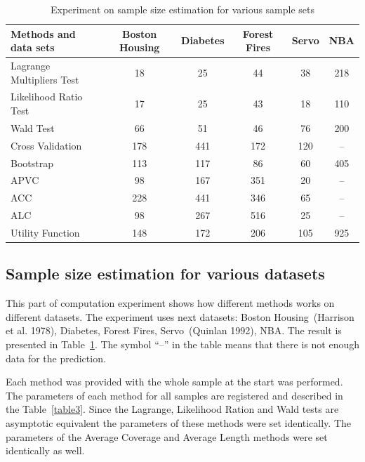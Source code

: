 \documentclass[
11pt,%
tightenlines,%
twoside,%
onecolumn,%
nofloats,%
nobibnotes,%
nofootinbib,%
superscriptaddress,%
noshowpacs,%
centertags]%
{revtex4}
\begin{document}
\begin{table}[!hbp]
\centering
\caption{Experiment on sample size estimation for various sample sets}
\label{table2}
\begin{tabular}{|l|c|c|c|c|c|}
\hline
 Methods and data sets                         & Boston Housing & Diabetes & Forest Fires & Servo & NBA \\ \hline\hline
Lagrange Multipliers Test & 18             & 25       & 44          & 38    & 218 \\ \hline
Likelihood Ratio Test     & 17             & 25       & 43          & 18    & 110 \\ \hline
Wald Test                 & 66             & 51       & 46          & 76    & 200 \\ \hline
Cross Validation          & 178            & 441      & 172         & 120   & --   \\ \hline
Bootstrap                 & 113            & 117      & 86          & 60    & 405 \\ \hline
APVC                      & 98             & 167      & 351         & 20    & --   \\ \hline
ACC                       & 228            & 441      & 346         & 65    & --   \\ \hline
ALC                       & 98             & 267      & 516         & 25    & --   \\ \hline
Utility Function          & 148            & 172      & 206         & 105   & 925 \\ \hline
\end{tabular}
\end{table}

\subsection{Sample size estimation for various datasets}
This part of computation experiment shows how different methods works on different datasets. The experiment uses next datasets: Boston Housing~(Harrison et al. 1978), Diabetes, Forest Fires, Servo~(Quinlan 1992), NBA.
The result is presented in Table~\ref{table2}. The symbol ``--'' in the table means that there is not enough data for the prediction.

Each method was provided with the whole sample at the start was performed. The parameters of each method for all samples are registered and described in the Table~\ref{table3}. Since the Lagrange, Likelihood Ration and Wald tests are asymptotic equivalent the parameters of these methods were set identically. The parameters of the Average Coverage and Average Length methods were set identically as well.
\end{document}

